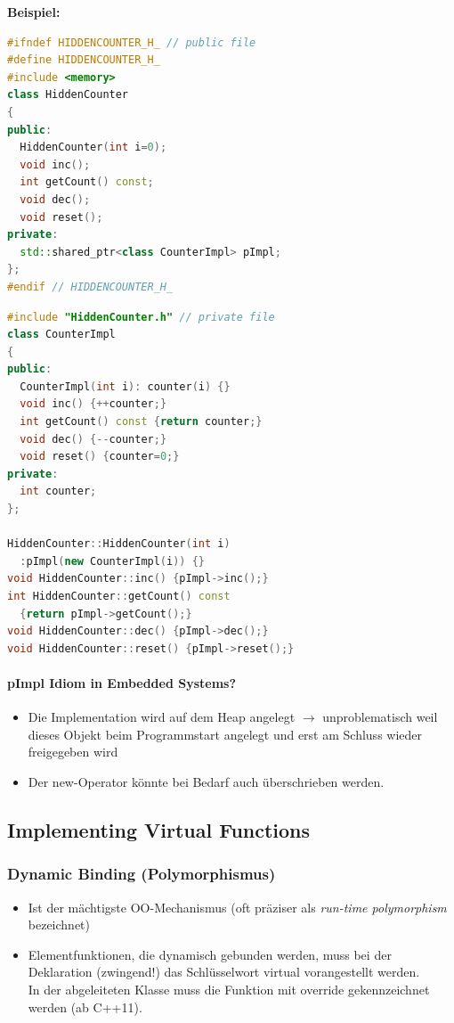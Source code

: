 \textbf{Beispiel:}
\begin{multicols}{2}
\begin{lstlisting}[language=C++]
#ifndef HIDDENCOUNTER_H_ // public file
#define HIDDENCOUNTER_H_
#include <memory>
class HiddenCounter
{
public:
  HiddenCounter(int i=0);
  void inc();
  int getCount() const;
  void dec();
  void reset();
private:
  std::shared_ptr<class CounterImpl> pImpl;
};
#endif // HIDDENCOUNTER_H_
\end{lstlisting}
\vfill\null
\columnbreak
\begin{lstlisting}[language=C++]
#include "HiddenCounter.h" // private file
class CounterImpl
{
public:
  CounterImpl(int i): counter(i) {}
  void inc() {++counter;}
  int getCount() const {return counter;}
  void dec() {--counter;}
  void reset() {counter=0;}
private:
  int counter;
};

HiddenCounter::HiddenCounter(int i)
  :pImpl(new CounterImpl(i)) {}
void HiddenCounter::inc() {pImpl->inc();}
int HiddenCounter::getCount() const
  {return pImpl->getCount();}
void HiddenCounter::dec() {pImpl->dec();}
void HiddenCounter::reset() {pImpl->reset();}
\end{lstlisting}
\end{multicols}

\paragraph{pImpl Idiom in Embedded Systems?}
\begin{itemize}
  \item Die Implementation wird auf dem Heap angelegt $\rightarrow$ unproblematisch weil dieses Objekt beim Programmstart angelegt und erst am Schluss wieder freigegeben wird
  \item Der new-Operator könnte bei Bedarf auch überschrieben werden.
\end{itemize}

\subsection{Implementing Virtual Functions}
\subsubsection{Dynamic Binding (Polymorphismus)}
\begin{itemize}
  \item Ist der mächtigste OO-Mechanismus (oft präziser als \textit{run-time polymorphism} bezeichnet)
  \item Elementfunktionen, die dynamisch gebunden werden, muss bei der Deklaration (zwingend!) das Schlüsselwort virtual vorangestellt werden.\\
  In der abgeleiteten Klasse muss die Funktion mit override gekennzeichnet werden (ab C++11).
\end{itemize}

